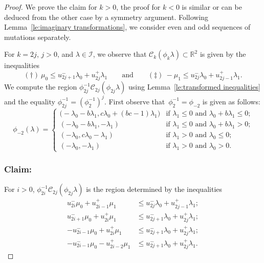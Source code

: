 \documentclass[pdflatex,sn-mathphys]{sn-jnl}%
\theoremstyle{thmstyleone}%
\theoremstyle{thmstyletwo}%
\theoremstyle{thmstylethree}%
\newcommand{\cC}{\mathcal{C}}
\newcommand{\cI}{\mathcal{I}}
\newcommand{\RR}{\mathbb{R}}
\begin{document}
  \begin{proof}
    We prove the claim for $k>0$, the proof for $k<0$ is similar or can be deduced from the other case by a symmetry argument.
    Following Lemma~\ref{le:imaginary transformations}, we consider even and odd sequences of mutations separately.

    For $k=2j$, $j>0$, and $\lambda\in\cI$, we observe that $\cC_k(\phi_k\lambda)\subset\RR^2$ is given by the inequalities 
    \[ (\dagger)\ \mu_0 \le u_{2j+1}^-\lambda_0+u_{2j}^+\lambda_1 \qquad\text{and}\qquad (\ddagger)\ -\mu_1\le u_{2j}^-\lambda_0+u_{2j-1}^+\lambda_1. \]
    We compute the region $\phi_{2j}^{-1}\cC_{2j}(\phi_{2j}\lambda)$ using Lemma~\ref{le:transformed inequalities} and the equality $\phi_{2j}^{-1}=\left(\phi_2^{-1}\right)^{j}$.
    First observe that~$\phi_2^{-1}=\phi_{-2}$ is given as follows:
    \begin{equation}
      \label{eq:backward two step mutation}
      \phi_{-2}(\lambda)
      =
      \begin{cases}
        \big(-\lambda_0-b\lambda_1, c\lambda_0+(bc-1)\lambda_1\big) & \text{if $\lambda_1\le 0$ and $\lambda_0+b\lambda_1\le 0$;}\\
        (-\lambda_0-b\lambda_1, -\lambda_1) & \text{if $\lambda_1\le 0$ and $\lambda_0+b\lambda_1>0$;}\\
        (-\lambda_0, c\lambda_0-\lambda_1) & \text{if $\lambda_1>0$ and $\lambda_0\le 0$;}\\
        (-\lambda_0,-\lambda_1) & \text{if $\lambda_1>0$ and $\lambda_0>0$.}
      \end{cases}
    \end{equation}
  
    \subsubsection*{Claim:} For $i>0$, $\phi_{2i}^{-1}\cC_{2j}(\phi_{2j}\lambda)$ is the region determined by the inequalities 
    \begin{align*}
      \tag{a} u_{2i}^-\mu_0+u_{2i-1}^+\mu_1 &\le u_{2j}^-\lambda_0+u_{2j-1}^+\lambda_1;\\
      \tag{b} u_{2i+1}^-\mu_0+u_{2i}^+\mu_1 &\le u_{2j+1}^-\lambda_0+u_{2j}^+\lambda_1;\\
      \tag{c} -u_{2i-1}^-\mu_0+u_{2i}^+\mu_1 &\le u_{2j+1}^-\lambda_0+u_{2j}^+\lambda_1;\\
      \tag{d} -u_{2i-1}^-\mu_0-u_{2i-2}^+\mu_1 &\le u_{2j+1}^-\lambda_0+u_{2j}^+\lambda_1.
    \end{align*}


\end{proof}
\end{document}
